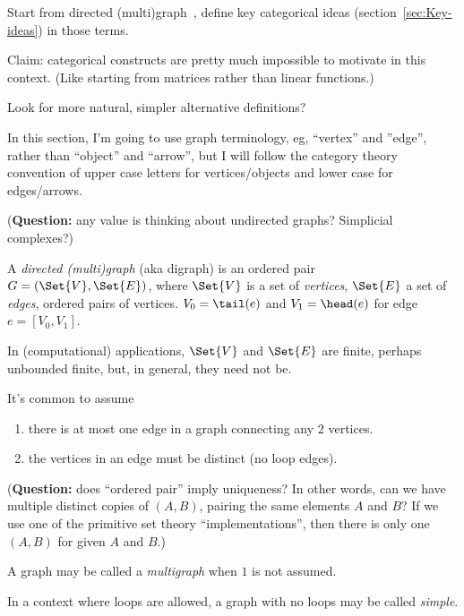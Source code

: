 \documentclass[11pt]{book}
\begin{document}
Start from directed (multi)graph~\cite{wiki_2020_directed_graph},
define key categorical ideas (section~\ref{sec:Key-ideas}) 
in those terms.

Claim: categorical constructs are 
pretty much impossible to motivate in this context.
(Like starting from matrices rather than linear functions.)

Look for more natural, simpler alternative definitions?

In this section, I'm going to use graph terminology,
eg, ``vertex'' and ''edge'', rather than ``object'' and ``arrow'',
but I will follow the category theory convention of
upper case letters for vertices/objects and lower case for
edges/arrows.

\label{sec:Directed_graph}

(\textbf{Question:}
 any value is thinking about undirected graphs?
 Simplicial complexes?)

\begin{definition}
A \textit{directed (multi)graph} (aka digraph) is
an ordered pair $G=\left( \Set{V}, \Set{E} \right)$,
where $\Set{V}$ is a set of \textit{vertices}, 
$\Set{E}$ a set of \textit{edges}, ordered pairs of vertices.
$V_0 = \tail(e)$ and $V_1 = \head(e)$
for edge $e = \left[ V_0, V_1 \right]$.
\end{definition}

In (computational) applications, $\Set{V}$ and $\Set{E}$ 
are finite, perhaps unbounded finite,
but, in general, they need not be.

It's common to assume 
\begin{enumerate}
\item there is at most one edge
in a graph connecting any $2$ vertices.\par
\item the vertices in an edge must be 
distinct (no loop edges).
\end{enumerate}
(\textbf{Question:} does ``ordered pair'' imply uniqueness?
In other words, can we have multiple distinct copies of
 $\left(A,B\right)$, pairing the same elements $A$ and $B$?
 If we use one of the primitive set theory ``implementations'',
 then there is only one $\left(A,B\right)$ 
 for given $A$ and $B$.)

A graph may be called a \textit{multigraph} when $1$ is
not assumed.

In a context where loops are allowed,
a graph with no loops may be called \textit{simple}.
\end{document}
